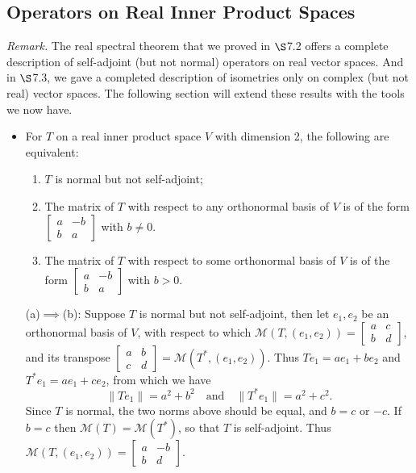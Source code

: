 \documentclass{article}
\newcommand{\nm}[1]{\| #1 \|}
\newcommand{\M}{\mathcal{M}}
\begin{document}
\subsection{Operators on Real Inner Product Spaces}
\textit{Remark.} The real spectral theorem that we proved in $\S$7.2 offers a complete description of self-adjoint (but not normal) operators on real vector spaces. And in $\S$7.3, we gave a completed description of isometries only on complex (but not real) vector spaces. The following section will extend these results with the tools we now have.
\begin{itemize}
    \item For $T$ on a real inner product space $V$ with dimension 2, the following are equivalent:
    \begin{enumerate}[label=(\alph*)]
        \item $T$ is normal but not self-adjoint;
        \item The matrix of $T$ with respect to any orthonormal basis of $V$ is of the form $\begin{bmatrix}
            a & -b \\ b & a
        \end{bmatrix}$ with $b \neq 0$.
        \item The matrix of $T$ with respect to some orthonormal basis of $V$ is of the form $\begin{bmatrix}
            a & -b \\ b & a
        \end{bmatrix}$ with $b > 0$.
    \end{enumerate}
    
    (a)$\implies$(b): Suppose $T$ is normal but not self-adjoint, then let $e_1,e_2$ be an orthonormal basis of $V$, with respect to which $\M(T,(e_1,e_2)) = \begin{bmatrix}
        a & c \\ b & d
    \end{bmatrix}$, and its transpose $\begin{bmatrix}
        a & b \\ c & d
    \end{bmatrix} = \M(T^*,(e_1,e_2))$. Thus $Te_1 = a e_1 + b e_2$ and $T^*e_1 = ae_1 + ce_2$, from which we have \[\nm{Te_1} = a^2 + b^2 \quad \text{and} \quad \nm{T^*e_1} = a^2 + c^2.\] Since $T$ is normal, the two norms above should be equal, and $b = c$ or $-c$. If $b = c$ then $\M(T) = \M(T^*)$, so that $T$ is self-adjoint. Thus $\M(T,(e_1,e_2)) = \begin{bmatrix}
        a & -b \\ b & d
    \end{bmatrix}$.


\end{itemize}
\end{document}
